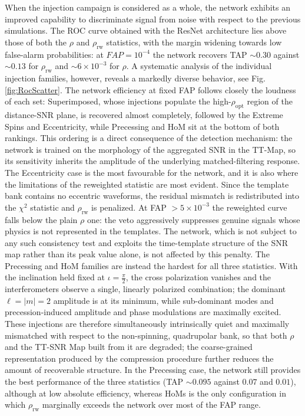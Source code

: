 \documentclass[aps,prd,twocolumn,superscriptaddress,nofootinbib, longbibliography]{revtex4-2}
\begin{document}
	When the injection campaign is considered as a whole, the network exhibits an improved capability to discriminate signal from noise with respect to the previous simulations. The ROC curve obtained with the ResNet architecture lies above those of both the $\rho$ and $\rho_\mathrm{rw}$ statistics, with the margin widening towards low false-alarm probabilities: at $FAP = 10^{-4}$ the network recovers TAP $\sim 0.30$ against $\sim 0.13$ for $\rho_\mathrm{rw}$ and $\sim 6 \times 10^{-3}$ for $\rho$.
	A systematic analysis of the individual injection families, however, reveals a markedly diverse behavior, see Fig. \ref{fig:RocScatter}. The network efficiency at fixed FAP follows closely the loudness of each set: Superimposed, whose injections populate the high-$\rho_\mathrm{opt}$ region of the distance-SNR plane, is recovered almost completely, followed by the Extreme Spins and Eccentricity, while Precessing and HoM sit at the bottom of both rankings. This ordering is a direct consequence of the detection mechanism: the network is trained on the morphology of the aggregated SNR in the TT-Map, so its sensitivity inherits the amplitude of the underlying matched-filtering response.
	The Eccentricity case is the most favourable for the network, and it is also where the limitations of the reweighted statistic are most evident. Since the template bank contains no eccentric waveforms, the residual mismatch is redistributed into the $\chi^2$ statistic and $\rho_\mathrm{rw}$ is penalized. At FAP $> 5 \times 10^{-3}$ the reweighted curve falls below the plain $\rho$ one: the veto aggressively suppresses genuine signals whose physics is not represented in the templates. The network, which is not subject to any such consistency test and exploits the time-template structure of the SNR map rather than its peak value alone, is not affected by this penalty.
	The Precessing and HoM families are instead the hardest for all three statistics. With the inclination held fixed at $\iota = \frac{\pi}{2}$, the cross polarization vanishes and the interferometers observe a single, linearly polarized combination; the dominant $ \ell = |m| = 2$ amplitude is at its minimum, while sub-dominant modes and precession-induced amplitude and phase modulations are maximally excited. These injections are therefore simultaneously intrinsically quiet and maximally mismatched with respect to the non-spinning, quadrupolar bank, so that both $\rho$ and the TT-SNR Map built from it are degraded; the coarse-grained representation produced by the compression procedure further reduces the amount of recoverable structure. In the Precessing case, the network still provides the best performance of the three statistics (TAP $\sim 0.095$ against $0.07$ and $0.01$), although at low absolute efficiency, whereas HoMs is the only configuration in which $\rho_\mathrm{rw}$ marginally exceeds the network over most of the FAP range. 
\end{document}
